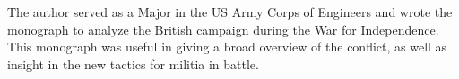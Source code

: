 The author served as a Major in the US Army Corps of Engineers and wrote the
monograph to analyze the British campaign during the War for Independence.
This monograph was useful in giving a broad overview of the conflict, as well
as insight in the new tactics for militia in battle.
